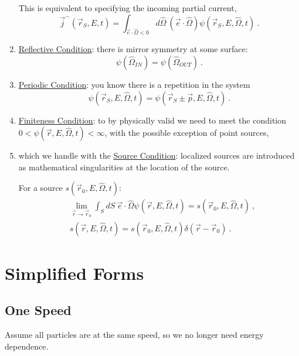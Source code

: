 \documentclass[12pt]{article}
\newcommand{\vOmega}{\ensuremath{\hat{\Omega}}}
\begin{document}
\begin{enumerate}
\begin{minipage}{0.45\textwidth}
This is equivalent to specifying the incoming partial current, $$\vec{j}^-(\vec{r}_S, E, t) = \int_{\vec{e} \cdot \vOmega < 0} d\vOmega \:(\vec{e} \cdot \vOmega) \psi(\vec{r}_S, E, \vOmega, t)\:.$$
\end{minipage}

\item \underline{Reflective Condition}: there is mirror symmetry at some surface:
\[\psi(\vOmega_{IN}) = \psi(\vOmega_{OUT})\:.\]

\item \underline{Periodic Condition}: you know there is a repetition in the system
\[\psi(\vec{r}_S, E, \vOmega, t) = \psi(\vec{r}_S \pm \vec{p}, E, \vOmega, t)\:.\]

\item \underline{Finiteness Condition}: to by physically valid we need to meet the condition \\$0 < \psi(\vec{r}, E, \vOmega, t) < \infty$, with the possible exception of point sources,

\item which we handle with the \underline{Source Condition}: localized sources are introduced as mathematical singularities at the location of the source.

For a source $s(\vec{r}_0, E, \vOmega, t)$:
\begin{align*}
&\lim_{\vec{r} \rightarrow \vec{r}_0} \int_S dS\: \vec{e} \cdot \vOmega \psi(\vec{r}, E, \vOmega, t) = s(\vec{r}_0, E, \vOmega, t)\:, \\
&s(\vec{r}, E, \vOmega, t) = s(\vec{r}_0, E, \vOmega, t)\delta(\vec{r} - \vec{r}_0)\:.
\end{align*}
\end{enumerate}


\section*{Simplified Forms}

\subsection*{One Speed}
Assume all particles are at the same speed, so we no longer need energy dependence.

%
\end{document}

